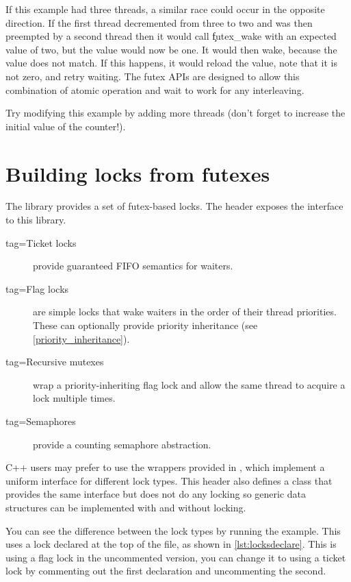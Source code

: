 If this example had three threads, a similar race could occur in the opposite direction.
If the first thread decremented from three to two and was then preempted by a second thread then it would call \c{futex_wake} with an expected value of two, but the value would now be one.
It would then wake, because the value does not match.
If this happens, it would reload the value, note that it is not zero, and retry waiting.
The futex APIs are designed to allow this combination of atomic operation and wait to work for any interleaving.

Try modifying this example by adding more threads (don't forget to increase the initial value of the counter!).

\section{Building locks from futexes}

The  library provides a set of futex-based locks.
The  header exposes the interface to this library.

\begin{description}
	\item[tag=Ticket locks]{ provide guaranteed FIFO semantics for waiters.}
	\item[tag=Flag locks]{  are simple locks that wake waiters in the order of their thread priorities.
	      These can optionally provide priority inheritance (see \ref{priority_inheritance}).}
	\item[tag=Recursive mutexes]{ wrap a priority-inheriting flag lock and allow the same thread to acquire a lock multiple times.}
	\item[tag=Semaphores]{ provide a counting semaphore abstraction.}
\end{description}

C++ users may prefer to use the wrappers provided in , which implement a uniform interface for different lock types.
This header also defines a  class that provides the same interface but does not do any locking so generic data structures can be implemented with and without locking.

You can see the difference between the lock types by running the  example.
This uses a lock declared at the top of the file, as shown in \ref{lst:locksdeclare}.
This is using a flag lock in the uncommented version, you can change it to using a ticket lock by commenting out the first declaration and uncommenting the second.


